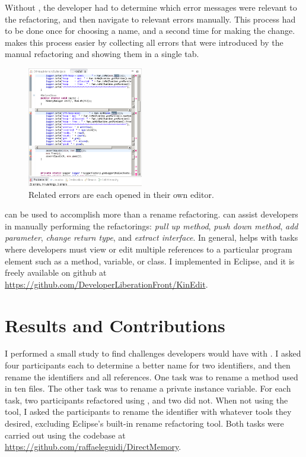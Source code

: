 \documentclass{sigplanconf}
\begin{document}
Without \pname{}, the developer had to determine which error messages were
relevant to the refactoring, and then navigate to relevant errors manually. This
process had to be done once for choosing a name, and a second time for making
the change. \pname{} makes this process easier by collecting all errors that
were introduced by the manual refactoring and showing them in a single tab.

\begin{figure}[h]
\begin{center}
\includegraphics[width=0.45\textwidth]{multiple-editors.png}
\caption{Related errors are each opened in their own editor.\label{mult}}
\end{center}
\end{figure}

\pname{} can be used to accomplish more than a rename refactoring.
\pname{} can assist developers in manually performing the refactorings:
\textit{pull up method}, \textit{push down method}, \textit{add parameter},
\textit{change return type}, and \textit{extract interface}.
In general,
\pname{} helps with tasks where developers must view or edit multiple
references to a particular program element such as a method, variable, or
class.
I implemented \pname{} in Eclipse, and it is freely available on
github at \url{https://github.com/DeveloperLiberationFront/KinEdit}.

\section{Results and Contributions}
I performed a small study to find challenges developers would have with
\pname{}. I asked four participants each to determine a better
name for two identifiers, and then rename the identifiers and all references.
One task was to rename a method used in ten files.
The other task was to rename a private instance variable.
For each task, two participants refactored using \pname{}, and two did not.
When not using the tool, I asked the participants to rename the
identifier with whatever tools they desired, excluding Eclipse's built-in rename
refactoring tool. Both tasks were carried out using the codebase at
\url{https://github.com/raffaeleguidi/DirectMemory}.
\end{document}
